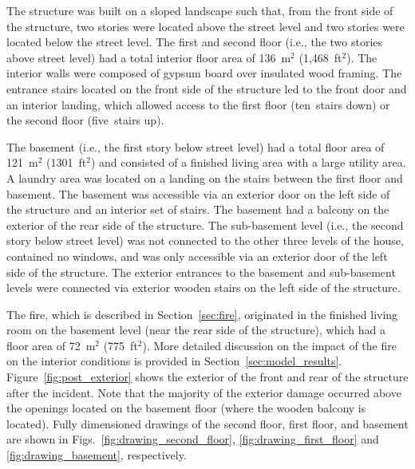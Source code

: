 \documentclass[12pt,oneside]{book}
\begin{document}
The structure was built on a sloped landscape such that, from the front side of the structure, two stories were located above the street level and two stories were located below the street level. The first and second floor (i.e., the two stories above street level) had a total interior floor area of 136~m$^2$ (1,468~ft$^2$). The interior walls were composed of gypsum board over insulated wood framing. The entrance stairs located on the front side of the structure led to the front door and an interior landing, which allowed access to the first floor (ten~stairs down) or the second floor (five~stairs up).

The basement (i.e., the first story below street level) had a total floor area of 121~m$^2$ (1301~ft$^2$) and consisted of a finished living area with a large utility area. A laundry area was located on a landing on the stairs between the first floor and basement. The basement was accessible via an exterior door on the left side of the structure and an interior set of stairs. The basement had a balcony on the exterior of the rear side of the structure. The sub-basement level (i.e., the second story below street level) was not connected to the other three levels of the house, contained no windows, and was only accessible via an exterior door of the left side of the structure. The exterior entrances to the basement and sub-basement levels were connected via exterior wooden stairs on the left side of the structure.

The fire, which is described in Section~\ref{sec:fire}, originated in the finished living room on the basement level (near the rear side of the structure), which had a floor area of 72~m$^2$ (775~ft$^2$). More detailed discussion on the impact of the fire on the interior conditions is provided in Section~\ref{sec:model_results}. Figure~\ref{fig:post_exterior} shows the exterior of the front and rear of the structure after the incident. Note that the majority of the exterior damage occurred above the openings located on the basement floor (where the wooden balcony is located). Fully dimensioned drawings of the second floor, first floor, and basement are shown in Figs.~\ref{fig:drawing_second_floor}, \ref{fig:drawing_first_floor} and \ref{fig:drawing_basement}, respectively.
\end{document}
